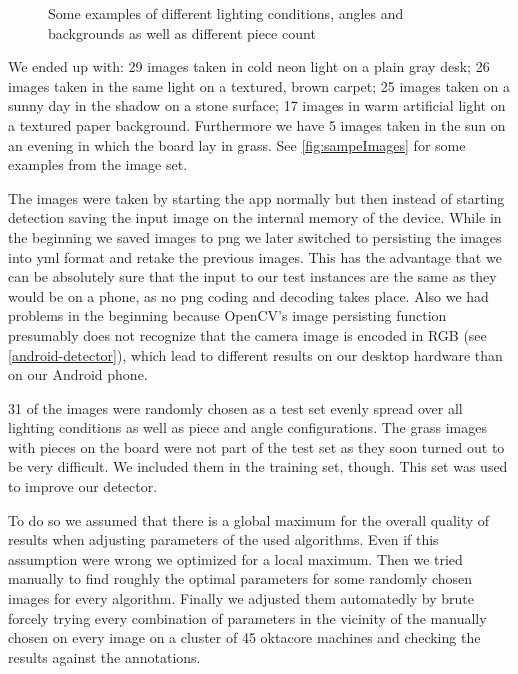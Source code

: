 \begin{figure}
		\caption{Some examples of different lighting conditions, angles and backgrounds as well as different piece count}
		\label{fig:sampeImages}
	\end{figure}

	We ended up with: 29 images taken in cold neon light on a plain gray desk; 26 images taken in the same light on a textured, brown carpet; 25 images taken on a sunny day in the shadow on a stone surface; 17 images in warm artificial light on a textured paper background. Furthermore we have 5 images taken in the sun on an evening in which the board lay in grass. See \autoref{fig:sampeImages} for some examples from the image set.

	The images were taken by starting the app normally but then instead of starting detection saving the input image on the internal memory of the device. While in the beginning we saved images to png we later switched to persisting the images into yml format and retake the previous images. This has the advantage that we can be absolutely sure that the input to our test instances are the same as they would be on a phone, as no png coding and decoding takes place. Also we had problems in the beginning because OpenCV's image persisting function presumably does not recognize that the camera image is encoded in RGB (see \autoref{android-detector}), which lead to different results on our desktop hardware than on our Android phone.

	31 of the images were randomly chosen as a test set evenly spread over all lighting conditions as well as piece and angle configurations. The grass images with pieces on the board were not part of the test set as they soon turned out to be very difficult. We included them in the training set, though. This set was used to improve our detector.

	To do so we assumed that there is a global maximum for the overall quality of results when adjusting parameters of the used algorithms. Even if this assumption were wrong we optimized for a local maximum. Then we tried manually to find roughly the optimal parameters for some randomly chosen images for every algorithm. Finally we adjusted them automatedly by brute forcely trying every combination of parameters in the vicinity of the manually chosen on every image on a cluster of 45 oktacore machines and checking the results against the annotations.






